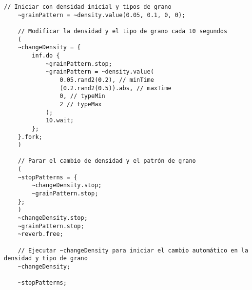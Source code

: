\begin{minipage}[t]{1\textwidth}
\begin{lstlisting}[style=SuperCollider-IDE, basicstyle=\footnotesize\ttfamily, numbers=none]
    // Iniciar con densidad inicial y tipos de grano
    ~grainPattern = ~density.value(0.05, 0.1, 0, 0);
    
    // Modificar la densidad y el tipo de grano cada 10 segundos
    (
    ~changeDensity = {
        inf.do {
            ~grainPattern.stop;
            ~grainPattern = ~density.value(
                0.05.rand2(0.2), // minTime
                (0.2.rand2(0.5)).abs, // maxTime
                0, // typeMin
                2 // typeMax
            );
            10.wait;
        };
    }.fork;
    )
    
    // Parar el cambio de densidad y el patrón de grano
    (
    ~stopPatterns = {
        ~changeDensity.stop;
        ~grainPattern.stop;
    };
    )
    ~changeDensity.stop;
    ~grainPattern.stop;
    ~reverb.free;
    
    // Ejecutar ~changeDensity para iniciar el cambio automático en la densidad y tipo de grano
    ~changeDensity;
    
    ~stopPatterns;
    \end{lstlisting}
    \vspace{1cm}
\end{minipage}


















